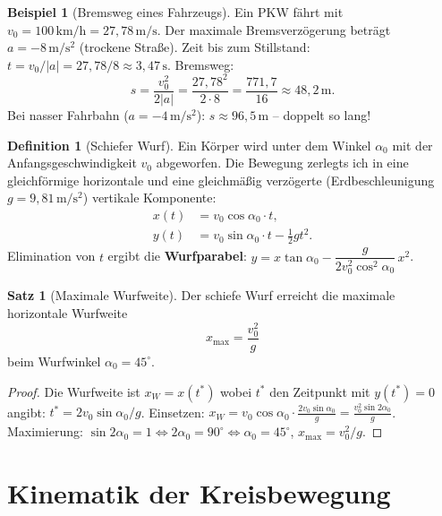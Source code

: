 ﻿\documentclass[a4paper,12pt]{report}
\theoremstyle{definition}
\newtheorem{definition}{Definition}
\newtheorem{beispiel}{Beispiel}
\newtheorem{satz}{Satz}
\begin{document}
\begin{beispiel}[Bremsweg eines Fahrzeugs]
Ein PKW f\"ahrt mit $v_0 = 100\,\mathrm{km/h} = 27{,}78\,\mathrm{m/s}$.
Der maximale Bremsverz\"ogerung betr\"agt $a = -8\,\mathrm{m/s^2}$ (trockene Stra\ss{}e).
Zeit bis zum Stillstand: $t = v_0/|a| = 27{,}78/8 \approx 3{,}47\,\mathrm{s}$.
Bremsweg:
\[
  s = \frac{v_0^2}{2|a|} = \frac{27{,}78^2}{2\cdot8} = \frac{771{,}7}{16} \approx 48{,}2\,\mathrm{m}.
\]
Bei nasser Fahrbahn ($a = -4\,\mathrm{m/s^2}$): $s \approx 96{,}5\,\mathrm{m}$ -- doppelt so lang!
\end{beispiel}

\begin{definition}[Schiefer Wurf]
Ein K\"orper wird unter dem Winkel $\alpha_0$ mit der Anfangsgeschwindigkeit $v_0$
abgeworfen. Die Bewegung zerlegts ich in eine gleichf\"ormige horizontale
und eine gleichm\"a\ss{}ig verzögerte (Erdbeschleunigung $g = 9{,}81\,\mathrm{m/s^2}$)
vertikale Komponente:
\begin{align*}
  x(t) &= v_0\cos\alpha_0\cdot t, \\
  y(t) &= v_0\sin\alpha_0\cdot t - \tfrac{1}{2}g t^2.
\end{align*}
Elimination von $t$ ergibt die \textbf{Wurfparabel}:
$y = x\tan\alpha_0 - \dfrac{g}{2v_0^2\cos^2\alpha_0}\,x^2$.
\end{definition}

\begin{satz}[Maximale Wurfweite]
Der schiefe Wurf erreicht die maximale horizontale Wurfweite
\[
  x_{\max} = \frac{v_0^2}{g}
\]
beim Wurfwinkel $\alpha_0 = 45^\circ$.
\end{satz}
\begin{proof}
Die Wurfweite ist $x_W = x(t^*)$ wobei $t^*$ den Zeitpunkt mit $y(t^*) = 0$ angibt:
$t^* = 2v_0\sin\alpha_0/g$.
Einsetzen: $x_W = v_0\cos\alpha_0 \cdot \frac{2v_0\sin\alpha_0}{g}
= \frac{v_0^2\sin 2\alpha_0}{g}$.
Maximierung: $\sin 2\alpha_0 = 1 \Leftrightarrow 2\alpha_0 = 90^\circ \Leftrightarrow \alpha_0 = 45^\circ$,
$x_{\max} = v_0^2/g$.
\end{proof}

\section{Kinematik der Kreisbewegung}
\end{document}
